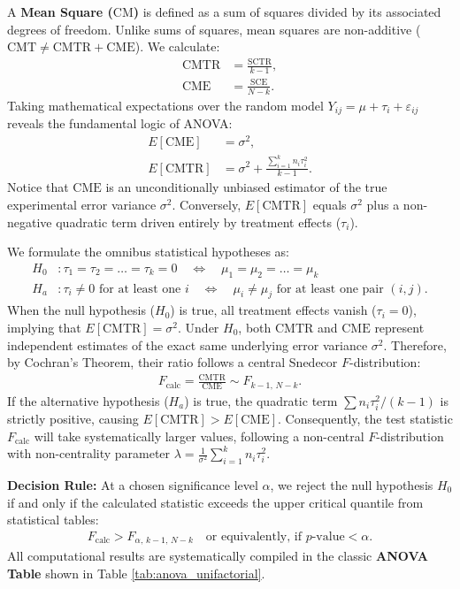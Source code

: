 A \textbf{Mean Square ($\text{CM}$)} is defined as a sum of squares divided by its associated degrees of freedom. Unlike sums of squares, mean squares are non-additive ($\text{CMT} \neq \text{CMTR} + \text{CME}$). We calculate:
\begin{align}
	\text{CMTR} &= \frac{\text{SCTR}}{k - 1}, \\
	\text{CME} &= \frac{\text{SCE}}{N - k}.
\end{align}
Taking mathematical expectations over the random model $Y_{ij} = \mu + \tau_i + \varepsilon_{ij}$ reveals the fundamental logic of ANOVA:
\begin{align}
	E[\text{CME}] &= \sigma^2, \\
	E[\text{CMTR}] &= \sigma^2 + \frac{\sum_{i=1}^k n_i \tau_i^2}{k - 1}.
\end{align}
Notice that $\text{CME}$ is an unconditionally unbiased estimator of the true experimental error variance $\sigma^2$. Conversely, $E[\text{CMTR}]$ equals $\sigma^2$ plus a non-negative quadratic term driven entirely by treatment effects ($\tau_i$).

We formulate the omnibus statistical hypotheses as:
\begin{align}
	H_0&: \tau_1 = \tau_2 = \dots = \tau_k = 0 \quad \Longleftrightarrow \quad \mu_1 = \mu_2 = \dots = \mu_k \\
	H_a&: \tau_i \neq 0 \text{ for at least one } i \quad \Longleftrightarrow \quad \mu_i \neq \mu_j \text{ for at least one pair } (i,j).
\end{align}
When the null hypothesis ($H_0$) is true, all treatment effects vanish ($\tau_i = 0$), implying that $E[\text{CMTR}] = \sigma^2$. Under $H_0$, both $\text{CMTR}$ and $\text{CME}$ represent independent estimates of the exact same underlying error variance $\sigma^2$. Therefore, by Cochran's Theorem, their ratio follows a central Snedecor $F$-distribution:
\begin{align}
	F_{\text{calc}} = \frac{\text{CMTR}}{\text{CME}} \sim F_{k-1, \, N-k}.
\end{align}
If the alternative hypothesis ($H_a$) is true, the quadratic term $\sum n_i \tau_i^2 / (k-1)$ is strictly positive, causing $E[\text{CMTR}] > E[\text{CME}]$. Consequently, the test statistic $F_{\text{calc}}$ will take systematically larger values, following a non-central $F$-distribution with non-centrality parameter $\lambda = \frac{1}{\sigma^2} \sum_{i=1}^k n_i \tau_i^2$.

\textbf{Decision Rule:} At a chosen significance level $\alpha$, we reject the null hypothesis $H_0$ if and only if the calculated statistic exceeds the upper critical quantile from statistical tables:
\begin{align}
	F_{\text{calc}} > F_{\alpha, \, k-1, \, N-k} \quad \text{or equivalently, if } p\text{-value} < \alpha.
\end{align}
All computational results are systematically compiled in the classic \textbf{ANOVA Table} shown in Table \ref{tab:anova_unifactorial}.

